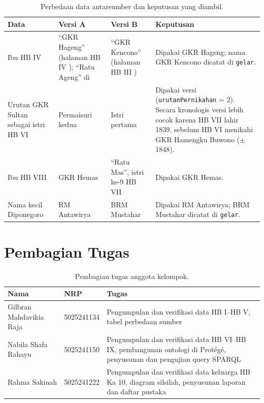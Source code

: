 \documentclass[11pt,a4paper]{article}
\begin{document}
\begin{table}[H]
\centering
\caption{Perbedaan data antarsumber dan keputusan yang diambil.}
\label{tab:beda}
\small
\begin{tabularx}{\textwidth}{>{\raggedright\arraybackslash}p{2.3cm} >{\raggedright\arraybackslash}X >{\raggedright\arraybackslash}X >{\raggedright\arraybackslash}X}
\toprule
\textbf{Data} & \textbf{Versi A} & \textbf{Versi B} & \textbf{Keputusan} \\
\midrule
Ibu HB IV & ``GKR Hageng'' (halaman HB IV \cite{kj-hb4}); ``Ratu Ageng'' di \cite{kj-hb5} & ``GKR Kencono'' (halaman HB III \cite{kj-hb3}) &
Dipakai GKR Hageng; nama GKR Kencono dicatat di \texttt{gelar}. \\
Urutan GKR Sultan sebagai istri HB VI & Permaisuri kedua \cite{kj-hb7} & Istri pertama \cite{ra-y6} &
Dipakai versi \cite{kj-hb7} (\texttt{urutanPernikahan} = 2). Secara kronologis versi \cite{ra-y6} lebih cocok karena HB VII lahir 1839,
sebelum HB VI menikahi GKR Hamengku Buwono ($\pm$1848). \\
Ibu HB VIII & GKR Hemas \cite{kj-hb8,wiki-hb8} & ``Ratu Mas'', istri ke-9 HB VII \cite{ra-y7} & Dipakai GKR Hemas. \\
Nama kecil Diponegoro & RM Antawirya \cite{kj-hb3} & BRM Mustahar \cite{wiki-dipo} & Dipakai RM Antawirya; BRM Mustahar dicatat di \texttt{gelar}. \\
\bottomrule
\end{tabularx}
\end{table}

\section{Pembagian Tugas}

\begin{table}[H]
\centering
\caption{Pembagian tugas anggota kelompok.}
\label{tab:tugas}
\begin{tabularx}{\textwidth}{l l >{\raggedright\arraybackslash}X}
\toprule
\textbf{Nama} & \textbf{NRP} & \textbf{Tugas} \\
\midrule
Gilbran Mahdavikia Raja & 5025241134 & Pengumpulan dan verifikasi data HB I--HB V, tabel perbedaan sumber \\
Nabila Shafa Rahayu & 5025241150 & Pengumpulan dan verifikasi data HB VI--HB IX, pembangunan ontologi di Prot\'eg\'e, penyusunan dan pengujian query SPARQL \\
Rahma Sakinah & 5025241222 & Pengumpulan dan verifikasi data keluarga HB Ka 10, diagram silsilah, penyusunan laporan dan daftar pustaka \\
\bottomrule
\end{tabularx}
\end{table}
\end{document}
